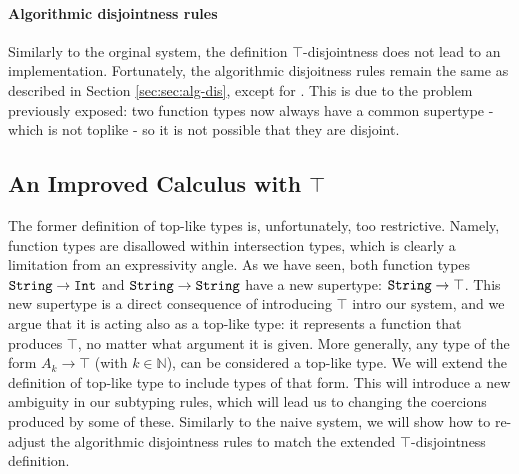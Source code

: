 




\paragraph{Algorithmic disjointness rules}

Similarly to the orginal system, the definition $\top$-disjointness does not lead to an implementation. 
Fortunately, the algorithmic disjoitness rules remain the same as described in Section \ref{sec:sec:alg-dis}, 
except for .
This is due to the problem previously exposed: two function types now always have a common supertype - which is not
toplike - so it is not possible that they are disjoint. 


\subsection{An Improved Calculus with $\top$}

The former definition of top-like types is, unfortunately, too restrictive.
Namely, function types are disallowed within intersection types, which is clearly a limitation from an expressivity
angle.
As we have seen, both function types $\texttt{String} \to \texttt{Int}$ and $\texttt{String} \to \texttt{String}$ have a new
supertype: 
$\texttt{String} \to \top$.
This new supertype is a direct consequence of introducing $\top$ intro our system,
and we argue that it is acting also as a top-like type: it represents a function that produces
$\top$, no matter what argument it is given.
More generally, any type of the form $A_k \to \top$ (with $k \in \mathbb{N}$), can be considered a top-like type.
We will extend the definition of top-like type to include types of that form. 
This will introduce a new ambiguity in our subtyping rules, which will lead us to changing the coercions produced by some of these.
Similarly to the naive system, we will show how to re-adjust the algorithmic disjointness rules to match the 
extended $\top$-disjointness definition. 

